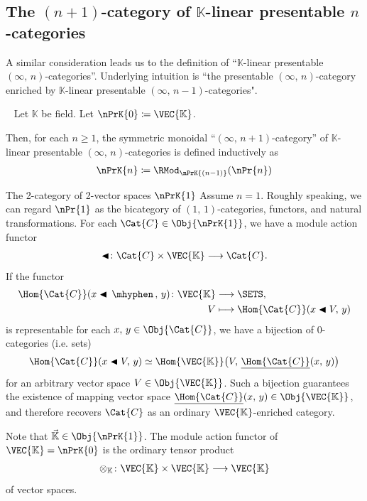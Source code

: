 \documentclass[TQFT_main]{subfiles}
\begin{document}
\subsection{{The $(n+1)$-category of $\mathbb{K}$-linear presentable $n$-categories}}

A similar consideration leads us to the definition of ``$\mathbb{K}$-linear presentable $(\infty,\, n)$-categories''.
Underlying intuition is ``the presentable $(\infty,\, n)$-category enriched by $\mathbb{K}$-linear presentable $(\infty,\, n-1)$-categories".

\begin{mydef}[label=def:nPrK]{{~\cite[DEFINITION 1.17.]{Scholze2026Gestalten}}}
    Let $\mathbb{K}$ be  field.  
    Let $\nPrK{0} \coloneqq \VEC{\mathbb{K}}$.

    Then, for each $n \ge 1$, the symmetric monoidal ``$(\infty,\, n+1)$-category'' of $\mathbb{K}$-linear presentable $(\infty,\, n)$-categories is defined inductively as
    \begin{align}
        \nPrK{n} \coloneqq \RMod_{\nPrK{(n-1)}} (\nPr{n})
    \end{align}
\end{mydef}

\begin{myexample}[label=ex:1PrC]{The 2-category of 2-vector spaces $\nPrK{1}$}
    Assume $n=1$.
    Roughly speaking, we can regard $\nPr{1}$ as the bicategory of $(1,\, 1)$-categories, functors, and natural transformations. 
    For each $\Cat{C} \in \Obj{\nPrK{1}}$, we have a module action functor
    \begin{align}
        \btl \colon \Cat{C} \times \VEC{\mathbb{K}} \lto \Cat{C}.
    \end{align}
    If the functor 
    \begin{align}
        \Hom{\Cat{C}} (x \btl \, \mhyphen \, ,\, y) \colon 
        \VEC{\mathbb{K}} &\lto \SETS, \\
        V &\lmto \Hom{\Cat{C}} (x \btl V,\, y)
    \end{align}
    is representable for each $x,\, y \in \Obj{\Cat{C}}$, we have a bijection of $0$-categories (i.e. sets)
    \begin{align}
        \Hom{\Cat{C}} (x \btl V,\, y) \simeq \Hom{\VEC{\mathbb{K}}} \bigl(V,\,  \underline{\Hom{\Cat{C}}} (x,\, y)\bigr)
    \end{align}
    for an arbitrary vector space $V \in \Obj{\VEC{\mathbb{K}}}$.
    Such a bijection guarantees the existence of mapping vector space $\underline{\Hom{\Cat{C}}}(x,\, y) \in \Obj{\VEC{\mathbb{K}}}$, and therefore recovers $\Cat{C}$ as an ordinary $\VEC{\mathbb{K}}$-enriched category.

    Note that $\Vec{\mathbb{K}} \in \Obj{\nPrK{1}}$. The module action functor of $\VEC{\mathbb{K}} = \nPrK{0}$ is the ordinary tensor product 
    \begin{align}
        \otimes_{\mathbb{K}} \colon \VEC{\mathbb{K}} \times \VEC{\mathbb{K}} \lto \VEC{\mathbb{K}}
    \end{align}
    of vector spaces.
\end{myexample}
\end{document}
